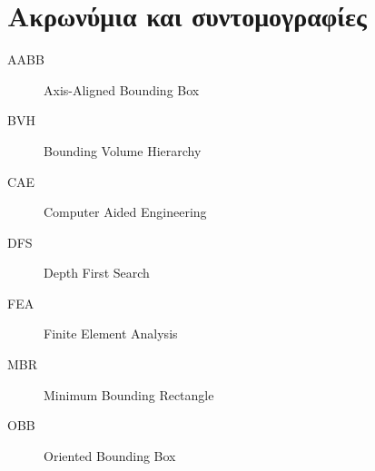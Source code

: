 \chapter{Ακρωνύμια και συντομογραφίες}

\begin{description}
  \item[AABB] Axis-Aligned Bounding Box
  \item[BVH] Bounding Volume Hierarchy
  \item[CAE] Computer Aided Engineering
  \item[DFS] Depth First Search
  \item[FEA] Finite Element Analysis
  \item[MBR] Minimum Bounding Rectangle
  \item[OBB] Oriented Bounding Box
\end{description}
